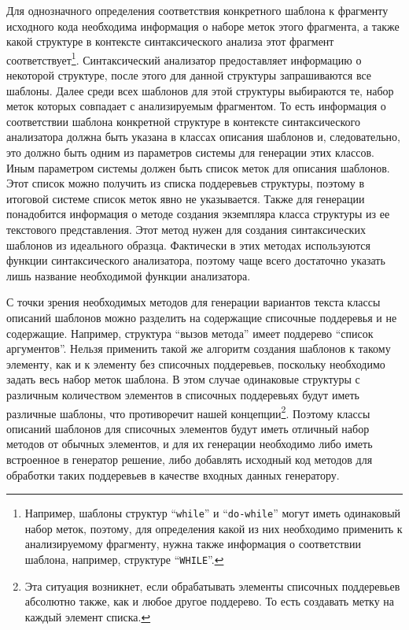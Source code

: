 \documentclass{matmex-diploma}
\begin{document}
Для однозначного определения соответствия конкретного шаблона к фрагменту исходного кода необходима информация о наборе меток этого фрагмента, а также какой структуре в контексте синтаксического анализа этот фрагмент соответствует\footnote{Например, шаблоны структур “\lstinline{while}” и “\lstinline{do-while}” могут иметь одинаковый набор меток, поэтому, для определения какой из них необходимо применить к анализируемому фрагменту, нужна также информация о соответствии шаблона, например, структуре “\lstinline{WHILE}”.}. Синтаксический анализатор предоставляет информацию о некоторой структуре, после этого для данной структуры запрашиваются все шаблоны. Далее среди всех шаблонов для этой структуры выбираются те, набор меток которых совпадает с анализируемым фрагментом. То есть информация о соответствии шаблона конкретной структуре в контексте синтаксического анализатора должна быть указана в классах описания шаблонов и, следовательно, это должно быть одним из параметров системы для генерации этих классов. Иным параметром системы должен быть список меток для описания шаблонов. Этот список можно получить из списка поддеревьев структуры, поэтому в итоговой системе список меток явно не указывается. Также для генерации понадобится информация о методе создания экземпляра класса структуры из ее текстового представления. Этот метод нужен для создания синтаксических шаблонов из идеального образца. Фактически в этих методах используются функции синтаксического анализатора, поэтому чаще всего достаточно указать лишь название необходимой функции анализатора. 

С точки зрения необходимых методов для генерации вариантов текста классы описаний шаблонов можно разделить на содержащие списочные поддеревья и не содержащие. Например, структура “вызов метода” имеет поддерево “список аргументов”. Нельзя применить такой же алгоритм создания шаблонов к такому элементу, как и к элементу без списочных поддеревьев, поскольку необходимо задать весь набор меток шаблона. В этом случае одинаковые структуры с различным количеством элементов в списочных поддеревьях будут иметь различные шаблоны, что противоречит нашей концепции\footnote{Эта ситуация возникнет, если обрабатывать элементы списочных поддеревьев абсолютно также, как и любое другое поддерево. То есть создавать метку на каждый элемент списка.}. Поэтому классы описаний шаблонов для списочных элементов будут иметь отличный набор методов от обычных элементов, и для их генерации необходимо либо иметь встроенное в генератор решение, либо добавлять исходный код методов для обработки таких поддеревьев в качестве входных данных генератору. 
\end{document}
